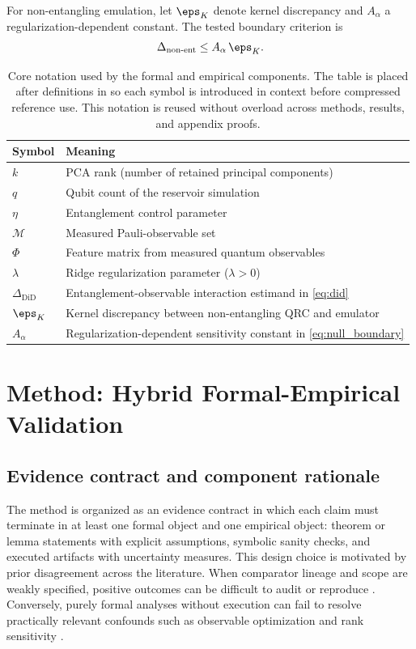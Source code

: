 \documentclass{article} %
\begin{document}
For non-entangling emulation, let $\eps_K$ denote kernel discrepancy and $A_\alpha$ a regularization-dependent constant. The tested boundary criterion is
\begin{equation}
\Delta_{\text{non-ent}}\le A_\alpha\,\eps_K.
\label{eq:null_boundary}
\end{equation}

\begin{table}[t]
\caption{Core notation used by the formal and empirical components. The table is placed after definitions in  so each symbol is introduced in context before compressed reference use. This notation is reused without overload across methods, results, and appendix proofs.}
\label{tab:notation}
\centering
\small
\renewcommand{\arraystretch}{1.1}
\setlength{\tabcolsep}{4pt}
\begin{tabular}{ll}
\toprule
Symbol & Meaning \\
\midrule
$k$ & PCA rank (number of retained principal components) \\
$q$ & Qubit count of the reservoir simulation \\
$\eta$ & Entanglement control parameter \\
$\mathcal{M}$ & Measured Pauli-observable set \\
$\Phi$ & Feature matrix from measured quantum observables \\
$\lambda$ & Ridge regularization parameter ($\lambda>0$) \\
$\Delta_{\mathrm{DiD}}$ & Entanglement-observable interaction estimand in \eqref{eq:did} \\
$\eps_K$ & Kernel discrepancy between non-entangling QRC and emulator \\
$A_\alpha$ & Regularization-dependent sensitivity constant in \eqref{eq:null_boundary} \\
\bottomrule
\end{tabular}
\end{table}

\section{Method: Hybrid Formal-Empirical Validation}\label{sec:method}
\subsection{Evidence contract and component rationale}
The method is organized as an evidence contract in which each claim must terminate in at least one formal object and one empirical object: theorem or lemma statements with explicit assumptions, symbolic sanity checks, and executed artifacts with uncertainty measures. This design choice is motivated by prior disagreement across the literature. When comparator lineage and scope are weakly specified, positive outcomes can be difficult to audit or reproduce \citep{S006,S020,S035}. Conversely, purely formal analyses without execution can fail to resolve practically relevant confounds such as observable optimization and rank sensitivity \citep{S001,S037,S038}.
\end{document}
